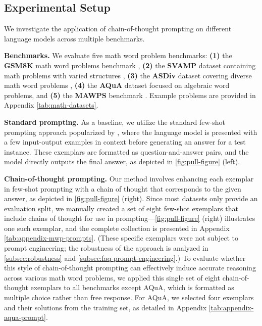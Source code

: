 \subsection{Experimental Setup}

We investigate the application of chain-of-thought prompting on different language models across multiple benchmarks.

\textbf{Benchmarks.}
We evaluate five math word problem benchmarks:
\textbf{(1)} the \textbf{GSM8K} math word problems benchmark \citep{cobbe2021training},
\textbf{(2)} the \textbf{SVAMP} dataset containing math problems with varied structures \citep{patel-etal-2021-nlp},
\textbf{(3)} the \textbf{ASDiv} dataset covering diverse math word problems \citep{miao-etal-2020-diverse},
\textbf{(4)} the \textbf{AQuA} dataset focused on algebraic word problems, and
\textbf{(5)} the \textbf{MAWPS} benchmark \citep{koncel-kedziorski-etal-2016-mawps}. Example problems are provided in Appendix \cref{tab:math-datasets}.

\textbf{Standard prompting.} As a baseline, we utilize the standard few-shot prompting approach popularized by \citet{brown2020language}, where the language model is presented with a few input-output examples in context before generating an answer for a test instance. These exemplars are formatted as question-and-answer pairs, and the model directly outputs the final answer, as depicted in \cref{fig:pull-figure} (left).

\textbf{Chain-of-thought prompting.} Our method involves enhancing each exemplar in few-shot prompting with a chain of thought that corresponds to the given answer, as depicted in \cref{fig:pull-figure} (right). Since most datasets only provide an evaluation split, we manually created a set of eight few-shot exemplars that include chains of thought for use in prompting—\cref{fig:pull-figure} (right) illustrates one such exemplar, and the complete collection is presented in Appendix \cref{tab:appendix-mwp-prompts}. (These specific exemplars were not subject to prompt engineering; the robustness of the approach is analyzed in \cref{subsec:robustness} and \cref{subsec:faq-prompt-engineering}.) To evaluate whether this style of chain-of-thought prompting can effectively induce accurate reasoning across various math word problems, we applied this single set of eight chain-of-thought exemplars to all benchmarks except AQuA, which is formatted as multiple choice rather than free response. For AQuA, we selected four exemplars and their solutions from the training set, as detailed in Appendix \cref{tab:appendix-aqua-prompt}.

